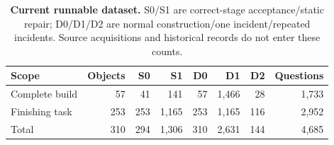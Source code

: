 \begin{table}[t]
\centering\small
\caption{\textbf{Current runnable dataset.} S0/S1 are correct-stage acceptance/static repair; D0/D1/D2 are normal construction/one incident/repeated incidents. Source acquisitions and historical records do not enter these counts.}
\label{tab:dataset}
\begin{tabularx}{\textwidth}{@{}Xrrrrrrr@{}}\toprule
Scope & Objects & S0 & S1 & D0 & D1 & D2 & Questions\\\midrule
Complete build & 57 & 41 & 141 & 57 & 1,466 & 28 & 1,733\\
Finishing task & 253 & 253 & 1,165 & 253 & 1,165 & 116 & 2,952\\
Total & 310 & 294 & 1,306 & 310 & 2,631 & 144 & 4,685\\
\bottomrule
\end{tabularx}
\end{table}
